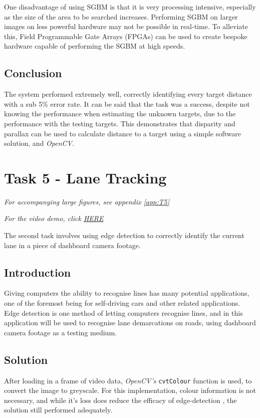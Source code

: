 \documentclass[conference]{IEEEtran}
\begin{document}
One disadvantage of using SGBM is that it is very processing intensive, especially as the size of the area to be searched increases. Performing SGBM on larger images on less powerful hardware may not be possible in real-time. To alleviate this, Field Programmable Gate Arrays (FPGAs) can be used to create bespoke hardware capable of performing the SGBM at high speeds\cite{HardwareSGBM}.
\subsection{Conclusion}
The system performed extremely well, correctly identifying every target distance with a sub 5\% error rate. It can be said that the task was a success, despite not knowing the performance when estimating the unknown targets, due to the performance with the testing targets. This demonstrates that disparity and parallax can be used to calculate distance to a target using a simple software solution, and \textit{OpenCV}. 

\section{Task 5 - Lane Tracking}
\textit{For accompanying large figures, see appendix \ref{app:T5}}

\textit{For the video demo, click \href{https://youtu.be/kW5fbNTTovo}{HERE}}

The second task involves using edge detection to correctly identify the current lane in a piece of dashboard camera footage. 
\subsection{Introduction}
Giving computers the ability to recognise lines has many potential applications, one of the foremost being for self-driving cars and other related applications. Edge detection is one method of letting computers recognise lines, and in this application will be used to recognise lane demarcations on roads, using dashboard camera footage as a testing medium.
\subsection{Solution}\label{2_solution}
After loading in a frame of video data, \textit{OpenCV's} \verb|cvtColour| function is used, to convert the image to greyscale. For this implementation, colour information is not necessary, and while it's loss does reduce the efficacy of edge-detection \cite{GreyVSColor}, the solution still performed adequately.  
\end{document}
